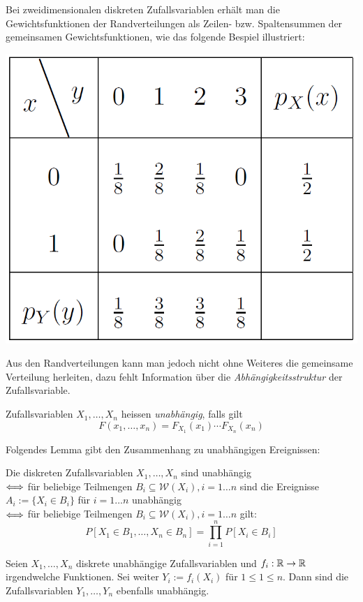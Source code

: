 Bei zweidimensionalen diskreten Zufallsvariablen erhält man die Gewichtsfunktionen der Randverteilungen als Zeilen- bzw. Spaltensummen der gemeinsamen Gewichtsfunktionen, wie das folgende Bespiel illustriert:
\begin{center}
\includegraphics[scale=0.44]{randverteilung.png}
\end{center}
Aus den Randverteilungen kann man jedoch nicht ohne Weiteres die gemeinsame Verteilung herleiten, dazu fehlt Information über die \textit{Abhängigkeitsstruktur} der Zufallsvariable.

\begin{definition}
Zufallsvariablen $X_1,\dots, X_n$ heissen \textit{unabhängig}, falls gilt
$$ F(x_1, \dots, x_n) = F_{X_1}(x_1) \cdots F_{X_n}(x_n)$$
\end{definition}
Folgendes Lemma gibt den Zusammenhang zu unabhängigen Ereignissen:
\begin{lemma}
Die diskreten Zufallsvariablen $X_1,\dots, X_n$ sind unabhängig\\ 
$\Longleftrightarrow$ für beliebige Teilmengen $B_i \subseteq \mathcal{W}(X_i), i = 1\dots n$ sind die Ereignisse $A_i := \{X_i \in B_i\}$ für $i= 1\dots n$ unabhängig \\
$\Longleftrightarrow$ für beliebige Teilmengen $B_i \subseteq \mathcal{W}(X_i), i = 1\dots n$ gilt:
$$ P[X_1 \in B_1, \dots, X_n \in B_n] = \prod_{i=1}^n P[X_i \in B_i]$$
\end{lemma}

\begin{satz}
Seien $X_1,\dots, X_n$ diskrete unabhängige Zufallsvariablen und $f_i :\mathbb{R} \to \mathbb{R}$ irgendwelche Funktionen. Sei weiter $Y_i := f_i(X_i)$ für $ 1 \leq 1 \leq n$. Dann sind die Zufallsvariablen $Y_1,\dots, Y_n$ ebenfalls unabhängig.
\end{satz}

